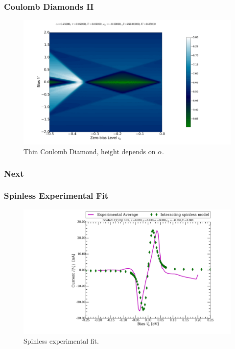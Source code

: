 \begin{frame}
    \frametitle{Coulomb Diamonds II}
    \vspace{-3mm}
    \begin{figure}[!b] 
        \centering
        \includegraphics[height=.85\textheight, width=\textwidth]{res/current_map_diamond_alpha_025.pdf}
        \vspace{-6mm}
        \caption{Thin Coulomb Diamond, height depends on $\alpha$.}
    \end{figure} 
\end{frame}
\begin{frame}
    \frametitle{Next}
\end{frame}
\begin{frame}
    \frametitle{Spinless Experimental Fit}
    \vspace{-3mm}
    \begin{figure}[!b] 
        \centering
        \includegraphics[height=.75\textheight, width=\textwidth, clip=true, trim=6cm 0cm 0cm 0cm]{res/spinless.pdf}
        \vspace{-6mm}
        \caption{Spinless experimental fit.}
    \end{figure} 
\end{frame}
